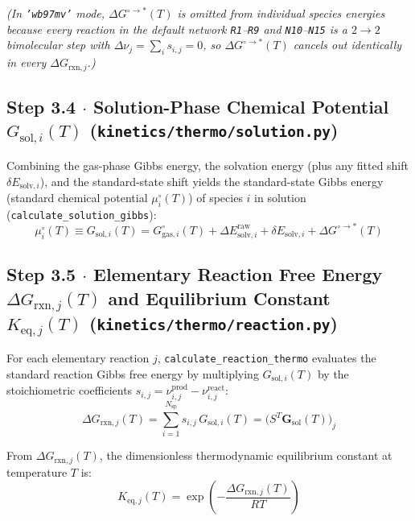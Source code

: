 \documentclass[11pt,a4paper]{article}
\begin{document}
\emph{(In \texttt{'wb97mv'} mode, $\Delta G^{\circ \to *}(T)$ is omitted from individual species energies because every reaction in the default network \texttt{R1}--\texttt{R9} and \texttt{N10}--\texttt{N15} is a $2 \to 2$ bimolecular step with $\Delta \nu_j = \sum_i s_{i,j} = 0$, so $\Delta G^{\circ \to *}(T)$ cancels out identically in every $\Delta G_{\text{rxn}, j}$.)}

\subsection*{Step 3.4 $\cdot$ Solution-Phase Chemical Potential $G_{\text{sol}, i}(T)$ (\texttt{kinetics/\allowbreak{}thermo/\allowbreak{}solution.py})}

Combining the gas-phase Gibbs energy, the solvation energy (plus any fitted shift $\delta E_{\text{solv}, i}$), and the standard-state shift yields the standard-state Gibbs energy (standard chemical potential $\mu_i^\circ(T)$) of species $i$ in solution (\texttt{calculate\_\allowbreak{}solution\_\allowbreak{}gibbs}):
\begin{equation}
\mu_i^\circ(T) \equiv G_{\text{sol}, i}(T) = G_{\text{gas}, i}^\circ(T) + \Delta E_{\text{solv}, i}^{\text{raw}} + \delta E_{\text{solv}, i} + \Delta G^{\circ \to *}(T)
\end{equation}

\subsection*{Step 3.5 $\cdot$ Elementary Reaction Free Energy $\Delta G_{\text{rxn}, j}(T)$ and Equilibrium Constant $K_{\text{eq}, j}(T)$ (\texttt{kinetics/\allowbreak{}thermo/\allowbreak{}reaction.py})}

For each elementary reaction $j$, \texttt{calculate\_\allowbreak{}reaction\_\allowbreak{}thermo} evaluates the standard reaction Gibbs free energy by multiplying $G_{\text{sol}, i}(T)$ by the stoichiometric coefficients $s_{i,j} = \nu_{i,j}^{\text{prod}} - \nu_{i,j}^{\text{react}}$:
\begin{equation}
\Delta G_{\text{rxn}, j}(T) = \sum_{i=1}^{N_{\text{sp}}} s_{i,j} \, G_{\text{sol}, i}(T) = \big(S^T \mathbf{G}_{\text{sol}}(T)\big)_j
\end{equation}

From $\Delta G_{\text{rxn}, j}(T)$, the dimensionless thermodynamic equilibrium constant at temperature $T$ is:
\begin{equation}
K_{\text{eq}, j}(T) = \exp\!\left(-\frac{\Delta G_{\text{rxn}, j}(T)}{R T}\right)
\end{equation}
\end{document}
